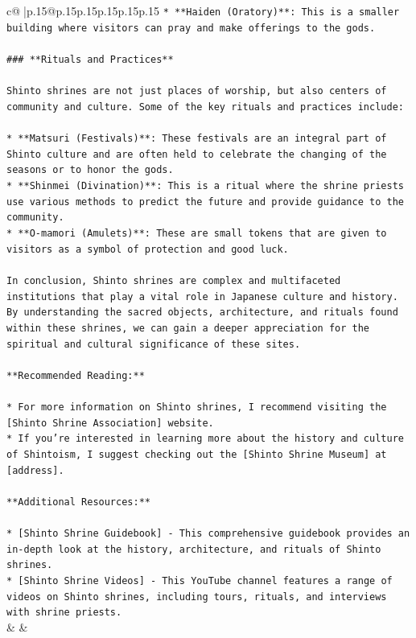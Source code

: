 \documentclass{article}
\begin{document}
{\begin{supertabular}{c@{$\;$}|p{.15\linewidth}@{}p{.15\linewidth}p{.15\linewidth}p{.15\linewidth}p{.15\linewidth}p{.15\linewidth}}
{{{\texttt{* **Haiden (Oratory)**: This is a smaller building where visitors can pray and make offerings to the gods.} \\
\\ 
\texttt{\#\#\# **Rituals and Practices**} \\
\\ 
\texttt{Shinto shrines are not just places of worship, but also centers of community and culture. Some of the key rituals and practices include:} \\
\\ 
\texttt{* **Matsuri (Festivals)**: These festivals are an integral part of Shinto culture and are often held to celebrate the changing of the seasons or to honor the gods.} \\
\texttt{* **Shinmei (Divination)**: This is a ritual where the shrine priests use various methods to predict the future and provide guidance to the community.} \\
\texttt{* **O{-}mamori (Amulets)**: These are small tokens that are given to visitors as a symbol of protection and good luck.} \\
\\ 
\texttt{In conclusion, Shinto shrines are complex and multifaceted institutions that play a vital role in Japanese culture and history. By understanding the sacred objects, architecture, and rituals found within these shrines, we can gain a deeper appreciation for the spiritual and cultural significance of these sites.} \\
\\ 
\texttt{**Recommended Reading:**} \\
\\ 
\texttt{* For more information on Shinto shrines, I recommend visiting the {[}Shinto Shrine Association{]} website.} \\
\texttt{* If you're interested in learning more about the history and culture of Shintoism, I suggest checking out the {[}Shinto Shrine Museum{]} at {[}address{]}.} \\
\\ 
\texttt{**Additional Resources:**} \\
\\ 
\texttt{* {[}Shinto Shrine Guidebook{]} {-} This comprehensive guidebook provides an in{-}depth look at the history, architecture, and rituals of Shinto shrines.} \\
\texttt{* {[}Shinto Shrine Videos{]} {-} This YouTube channel features a range of videos on Shinto shrines, including tours, rituals, and interviews with shrine priests.} \\
            }
        }
    }
    & & \\ \\


\end{supertabular}}
\end{document}
